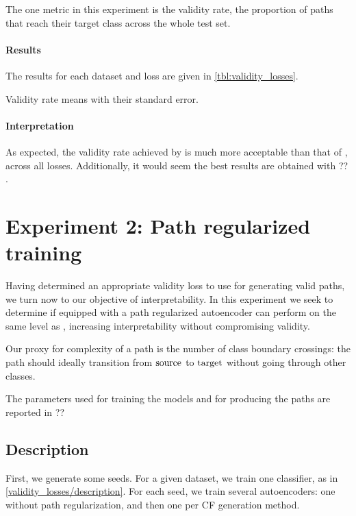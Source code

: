 \documentclass[../main.tex]{subfiles}
\begin{document}
The one metric in this experiment is the validity rate, \ie{} the proportion of paths that reach their target class across the whole test set.

\paragraph{Results}

The results for each dataset and loss are given in \autoref{tbl:validity_losses}.

\begin{table}[h!]
\centering

    \caption{Validity rate means with their standard error.}
\label{tbl:validity_losses}
\end{table}

\paragraph{Interpretation}

As expected, the validity rate achieved by \revise{} is much more acceptable than that of \ls{}, across all losses.
Additionally, it would seem the best results are obtained with ?? .

\section{Experiment 2: Path regularized training}
\label{exp/path_reg}

Having determined an appropriate validity loss to use for generating valid paths, we turn now to our objective of interpretability.
In this experiment we seek to determine if \ls{} equipped with a path regularized autoencoder can perform on the same level as \revise{}, increasing interpretability without compromising validity.

Our proxy for complexity of a path is the number of class boundary crossings:
the path should ideally transition from $\mathrm{source}$ to $\mathrm{target}$ without going through other classes.

The parameters used for training the models and for producing the paths are reported in ?? 

\subsection{Description}

First, we generate some seeds.
For a given dataset, we train one classifier, as in \autoref{validity_losses/description}.
For each seed, we train several autoencoders: one without path regularization, and then one per CF generation method.
\end{document}
